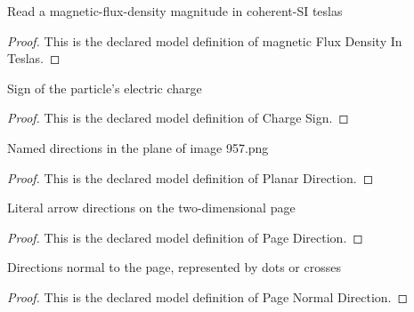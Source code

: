 \begin{definition}
  \label{def:physics:phyx-mini-0957:phyxminiproblems-problemphyxmini0957-magneticfluxdensityinteslas}
  Read a magnetic-flux-density magnitude in coherent-SI teslas
\end{definition}
\begin{proof}
  This is the declared model definition of magnetic Flux Density In Teslas.
\end{proof}
\begin{definition}
  \label{def:physics:phyx-mini-0957:phyxminiproblems-problemphyxmini0957-chargesign}
  Sign of the particle's electric charge
\end{definition}
\begin{proof}
  This is the declared model definition of Charge Sign.
\end{proof}
\begin{definition}
  \label{def:physics:phyx-mini-0957:phyxminiproblems-problemphyxmini0957-planardirection}
  Named directions in the plane of image 957.png
\end{definition}
\begin{proof}
  This is the declared model definition of Planar Direction.
\end{proof}
\begin{definition}
  \label{def:physics:phyx-mini-0957:phyxminiproblems-problemphyxmini0957-pagedirection}
  Literal arrow directions on the two-dimensional page
\end{definition}
\begin{proof}
  This is the declared model definition of Page Direction.
\end{proof}
\begin{definition}
  \label{def:physics:phyx-mini-0957:phyxminiproblems-problemphyxmini0957-pagenormaldirection}
  Directions normal to the page, represented by dots or crosses
\end{definition}
\begin{proof}
  This is the declared model definition of Page Normal Direction.
\end{proof}
